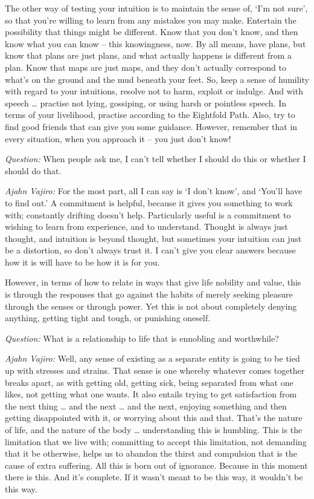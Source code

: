 The other way of testing your intuition is to maintain the sense of, `I'm not
sure', so that you're willing to learn from any mistakes you may make. Entertain
the possibility that things might be different. Know that you don't know, and
then know what you can know -- this knowingness, now. By all means, have plans,
but know that plans are just plans, and what actually happens is different from
a plan. Know that maps are just maps, and they don't actually correspond to
what's on the ground and the mud beneath your feet. So, keep a sense of humility
with regard to your intuitions, resolve not to harm, exploit or indulge. And with speech \ldots{} practise not lying, gossiping, or using harsh or pointless
speech. In terms of your livelihood, practise according to the Eightfold Path.
Also, try to find good friends that can give you some guidance. However,
remember that in every situation, when you approach it -- you just don't know!

\bigskip

\emph{Question:} When people ask me, I can't tell whether I should do this or whether I
should do that.

\emph{Ajahn Vajiro:} For the most part, all I can say is `I don't know', and `You'll
have to find out.' A commitment is helpful, because it gives you something to
work with; constantly drifting doesn't help. Particularly useful is a commitment
to wishing to learn from experience, and to understand. Thought is always just
thought, and intuition is beyond thought, but sometimes your intuition can just
be a distortion, so don't always trust it. I can't give you clear answers
because how it is will have to be how it is for you.

However, in terms of how to relate in ways that give life nobility and value,
this is through the responses that go against the habits of merely seeking
pleasure through the senses or through power. Yet this is not about completely
denying anything, getting tight and tough, or punishing oneself.

\bigskip

\emph{Question:} What is a relationship to life that is ennobling and worthwhile?

\emph{Ajahn Vajiro:} Well, any sense of existing as a separate entity is going to be
tied up with stresses and strains. That sense is one whereby whatever comes
together breaks apart, as with getting old, getting sick, being separated from
what one likes, not getting what one wants. It also entails trying to get
satisfaction from the next thing \ldots{} and the next \ldots{} and the next,
enjoying something and then getting disappointed with it, or worrying about this
and that. That's the nature of life, and the nature of the body \ldots{}
understanding this is humbling. This is the limitation that we live with;
committing to accept this limitation, not demanding that it be otherwise, helps
us to abandon the thirst and compulsion that is the cause of extra suffering.
All this is born out of ignorance. Because in this moment there is this. And
it's complete. If it wasn't meant to be this way, it wouldn't be this way.

